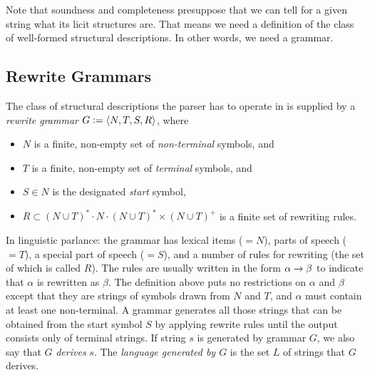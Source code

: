 Note that soundness and completeness presuppose that we can tell for a given string what its licit structures are.
That means we need a definition of the class of well-formed structural descriptions.
In other words, we need a grammar.

\subsection{Rewrite Grammars}
\label{sub:BigPicture_Grammars}
The class of structural descriptions the parser has to operate in is supplied by a \emph{rewrite grammar} $G \mathrel{\mathop:}= \left \langle N, T, S, R \right \rangle $, where
%
\begin{itemize}
    \item $N$ is a finite, non-empty set of \emph{non-terminal} symbols, and
    \item $T$ is a finite, non-empty set of \emph{terminal} symbols, and
    \item $S \in N$ is the designated \emph{start} symbol,
    \item $R \subset (N \cup T)^* \cdot N \cdot (N \cup T)^* \times (N \cup T)^+$ is a finite set of rewriting rules.
\end{itemize}
%
In linguistic parlance: the grammar has lexical items ($= N$), parts of speech ($=T$), a special part of speech ($=S$), and a number of rules for rewriting (the set of which is called $R$).
The rules are usually written in the form $\alpha \rightarrow \beta$ to indicate that $\alpha$ is rewritten as $\beta$.
The definition above puts no restrictions on $\alpha$ and $\beta$ except that they are strings of symbols drawn from $N$ and $T$, and $\alpha$ must contain at least one non-terminal.
A grammar generates all those strings that can be obtained from the start symbol $S$ by applying rewrite rules until the output consists only of terminal strings.
If string $s$ is generated by grammar $G$, we also say that $G$ \emph{derives} $s$.
The \emph{language generated by $G$} is the set $L$ of strings that $G$ derives.
%
